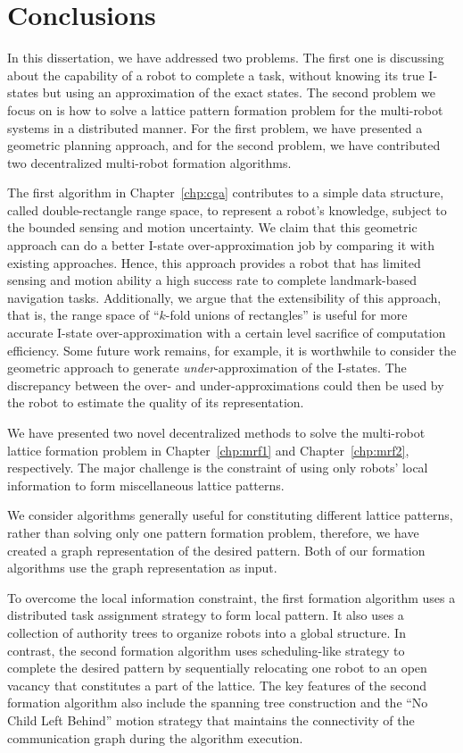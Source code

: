 \chapter{Conclusions}
\label{chp:conc}

In this dissertation, we have addressed two problems. 
The first one is discussing about the capability of a robot to complete a task, without knowing its true I-states but using an approximation of the exact states.
%
The second problem we focus on is how to solve a lattice pattern formation problem for the multi-robot systems in a distributed manner. 
%
For the first problem, we have presented a geometric planning approach, and for the second problem, we have contributed two decentralized multi-robot formation algorithms.


The first algorithm in Chapter~\ref{chp:cga} contributes to a simple data structure, called double-rectangle range space, to represent a robot's knowledge, subject to the bounded sensing and motion uncertainty. 
%
We claim that this geometric approach can do a better I-state over-approximation job by comparing it with existing approaches. 
%
Hence, this approach provides a robot that has limited sensing and motion ability a high success rate to complete landmark-based navigation tasks.
%
Additionally, we argue that the extensibility of this approach, that is, the range space of ``$k$-fold unions of rectangles'' is useful for more accurate I-state over-approximation with a certain level sacrifice of computation efficiency.
%
Some future work remains, 
for example, it is worthwhile to consider the geometric approach to
generate \emph{under}-approximation of the I-states.  
%
The discrepancy between the over- and under-approximations could then be used by the robot to estimate the quality of its representation.

We have presented two novel decentralized methods to solve the multi-robot lattice formation problem in Chapter~\ref{chp:mrf1} and Chapter~\ref{chp:mrf2}, respectively. 
%
The major challenge is the constraint of using only robots' local information to form miscellaneous lattice patterns.  

We consider algorithms generally useful for constituting different lattice patterns, rather than solving only one pattern formation problem, therefore, we have created a graph representation of the desired pattern.
%
Both of our formation algorithms use the graph representation as input.


To overcome the local information constraint, the first formation algorithm uses a distributed task assignment strategy to form local pattern. 
%
It also uses a collection of authority trees to organize robots into a global structure.
%
In contrast, the second formation algorithm uses scheduling-like strategy to complete the desired pattern by sequentially relocating one robot to an open vacancy that constitutes a part of the lattice. 
%
The key features of the second formation algorithm also include the spanning tree construction and the ``No Child Left Behind'' motion strategy that maintains the connectivity of the communication graph during the algorithm execution.

